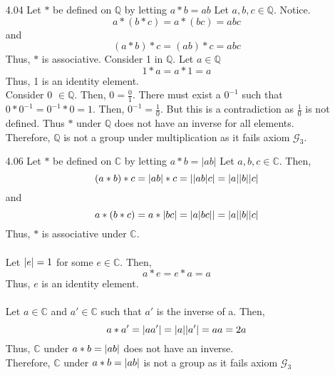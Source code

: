 \documentclass[12pt]{article}
\newcommand{\C}{\mathbb{C}}
\newcommand{\Q}{\mathbb{Q}}
\DeclarePairedDelimiter\abs{\lvert}{\rvert}
\begin{document}
\begin{enumerate}
			\item[4.04] Let $*$ be defined on $\Q$ by letting $a* b = ab$
				Let $ a,b,c \in \Q $. Notice.
				\[a*(b*c)=a*(bc)=abc\]
				and
				\[(a*b)*c=(ab)*c=abc\]
				Thus, $ * $ is associative.
				Consider 1 in $ \Q $. Let $ a \in \Q $
					\[1*a=a*1=a\]
				Thus, 1 is an identity element.\\
				Consider 0 $ \in\Q $. Then, $ 0 = \frac{0}{1} $. There must exist a $ 0^{-1} $ such that $ 0*0^{-1}=0^{-1}*0=1 $. Then, $ 0^{-1} = \frac{1}{0} $. But this is a contradiction as $ \frac{1}{0} $ is not defined. Thus $ * $ under $ \Q $ does not have an inverse for all elements.\\
				Therefore, $ \Q $ is not a group under multiplication as it fails axiom $ \mathscr{G_3} $.
			\item[4.06] Let $*$ be defined on $\C$ by letting $a* b = |ab|$
				Let $ a,b,c\in\C $. Then,
				\[(a*b)*c=\abs{ab}*c=\abs{\abs{ab}c}=\abs{a}\abs{b}\abs{c}\]
				and
				\[a*(b*c)=a*\abs{bc}=\abs{a\abs{bc}}=\abs{a}\abs{b}\abs{c}\]
				Thus, $ * $ is associative under $ \C $.\\
				\\
				Let $ \abs{e} =1 $ for some $ e\in\C $. Then, 
				\[a*e=e*a=a\]
				Thus, $ e $ is an identity element.\\
				\\
				Let $ a\in\C $ and $ a'\in\C $ such that $ a' $ is the inverse of a. Then,
				\[a*a'=\abs{aa'}=\abs{a}\abs{a'}=aa=2a\]
				Thus, $ \C $ under $ a*b=\abs{ab} $ does not have an inverse.\\
				Therefore,  $ \C $ under $ a*b=\abs{ab} $ is not a group as it fails axiom $ \mathscr{G_3} $
				

\end{enumerate}
\end{document}
